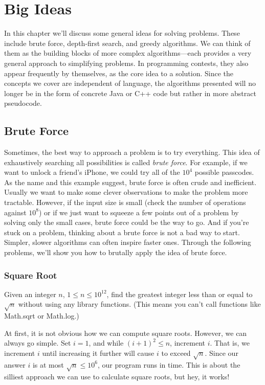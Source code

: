 \chapter{Big Ideas}

In this chapter we'll discuss some general ideas for solving problems. These include brute force,  depth-first search, and greedy algorithms. We can think of them as the building blocks of more complex algorithms---each provides a very general approach to simplifying problems. In programming contests, they also appear frequently by themselves, as the core idea to a solution. Since the concepts we cover are independent of language, the algorithms presented will no longer be in the form of concrete Java or C++ code but rather in more abstract pseudocode.

\section{Brute Force}

Sometimes, the best way to approach a problem is to try everything. This idea of exhaustively searching all possibilities is called \emph{brute force}. For example, if we want to unlock a friend's iPhone, we could try all of the $10^4$ possible passcodes. As the name and this example suggest, brute force is often crude and inefficient. Usually we want to make some clever observations to make the problem more tractable. However, if the input size is small (check the number of operations against $10^8$) or if we just want to squeeze a few points out of a problem by solving only the small cases, brute force could be the way to go. And if you're stuck on a problem, thinking about a brute force is not a bad way to start. Simpler, slower algorithms can often inspire faster ones. Through the following problems, we'll show you how to brutally apply the idea of brute force.

\subsection{Square Root}

\begin{typewriter}
  Given an integer $n$, $1 \le n \le 10^{12}$, find the greatest integer less than or equal to $\sqrt{n}$ without using any library functions. (This means you can't call functions like Math.sqrt or Math.log.)
\end{typewriter}

At first, it is not obvious how we can compute square roots. However, we can always go simple. Set $i = 1$, and while $(i+1)^2\le n$, increment $i$. That is, we increment $i$ until increasing it further will cause $i$ to exceed $\sqrt n$. Since our answer $i$ is at most $\sqrt n \le 10^6$, our program runs in time. This is about the silliest approach we can use to calculate square roots, but hey, it works!


